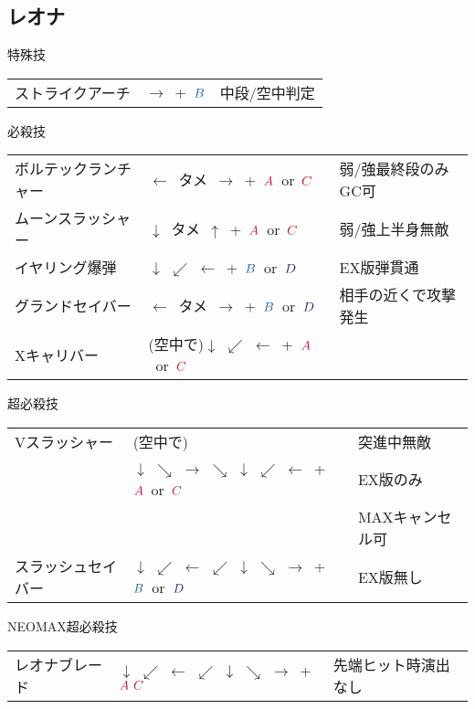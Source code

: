 \documentclass[a4j,11pt]{jarticle}
\def\A{\textcolor{Acolor}{A}}
\def\C{\textcolor{Ccolor}{C}}
\def\B{\textcolor{Bcolor}{B}}
\def\D{\textcolor{Dcolor}{D}}
\def\vtame{$\downarrow$\ タメ\ $\uparrow$}
\def\htame{$\leftarrow$\ タメ\ $\rightarrow$}
\def\tatsu{$\downarrow$ $\swarrow$ $\leftarrow$}%
\def\ryuko{$\downarrow$ $\searrow$ $\rightarrow$ $\searrow$ $\downarrow$ $\swarrow$ $\leftarrow$}%
\def\orochi{$\downarrow$ $\swarrow$ $\leftarrow$ $\swarrow$ $\downarrow$ $\searrow$ $\rightarrow$}%
\begin{document}
\subsection{レオナ}
\begin{itembox}[l]{特殊技}
\begin{tabular}{lll}
ストライクアーチ&$\rightarrow$\ +\ $\B$&中段/空中判定\\
\end{tabular}
\end{itembox}
\begin{itembox}[l]{必殺技}
\begin{tabular}{lll}
ボルテックランチャー&\htame\ +\ $\A$\ or\ $\C$&弱/強最終段のみGC可\\
ムーンスラッシャー&\vtame\ +\ $\A$\ or\ $\C$&弱/強上半身無敵\\
イヤリング爆弾&\tatsu\ +\ $\B$\ or\ $\D$&EX版弾貫通\\
グランドセイバー&\htame\ +\ $\B$\ or\ $\D$&相手の近くで攻撃発生\\
Xキャリバー&(空中で)\tatsu\ +\ $\A$\ or\ $\C$&
\end{tabular}
\end{itembox}
\begin{itembox}[l]{超必殺技}
\begin{tabular}{lll}
Vスラッシャー&(空中で)&突進中無敵\\
&\ryuko\ +\ $\A$\ or\ $\C$&EX版のみ\\
&&MAXキャンセル可\\
スラッシュセイバー&\orochi\ +\ $\B$\ or\ $\D$&EX版無し
\end{tabular}
\end{itembox}
\begin{itembox}[l]{NEOMAX超必殺技}
\begin{tabular}{lll}
レオナブレード&\orochi\ +\ $\A\ \C$&先端ヒット時演出なし
\end{tabular}
\end{itembox}
\newpage
\end{document}
